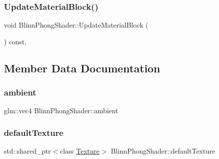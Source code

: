 \hypertarget{class_blinn_phong_shader_aa247270120b46431b436220ea6e777be}{}\label{class_blinn_phong_shader_aa247270120b46431b436220ea6e777be}
\subsubsection{\texorpdfstring{Update\+Material\+Block()}{UpdateMaterialBlock()}}
{\footnotesize\ttfamily void Blinn\+Phong\+Shader\+::\+Update\+Material\+Block (\begin{DoxyParamCaption}{ }\end{DoxyParamCaption}) const\hspace{0.3cm}{\ttfamily [protected]}, {\ttfamily [virtual]}}



\subsection{Member Data Documentation}
\hypertarget{class_blinn_phong_shader_af612b03df22b2bc9e37dcd85124ee9d2}{}\label{class_blinn_phong_shader_af612b03df22b2bc9e37dcd85124ee9d2}
\subsubsection{\texorpdfstring{ambient}{ambient}}
{\footnotesize\ttfamily glm\+::vec4 Blinn\+Phong\+Shader\+::ambient\hspace{0.3cm}{\ttfamily [protected]}}

\hypertarget{class_blinn_phong_shader_a2335cf5c2d95098a94f9f2e888b329f3}{}\label{class_blinn_phong_shader_a2335cf5c2d95098a94f9f2e888b329f3}
\subsubsection{\texorpdfstring{default\+Texture}{defaultTexture}}
{\footnotesize\ttfamily std\+::shared\+\_\+ptr$<$class \hyperlink{class_texture}{Texture}$>$ Blinn\+Phong\+Shader\+::default\+Texture\hspace{0.3cm}{\ttfamily [private]}}


